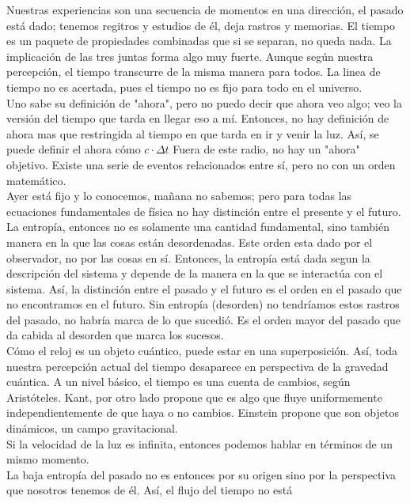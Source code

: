 \documentclass[12pt,a4paper]{report}
\begin{document}
\begin{enumerate}
{			Nuestras experiencias son una secuencia de momentos en una dirección,
			el pasado está dado; tenemos regitros y estudios de él, deja rastros y
			memorias.
			El tiempo es un paquete de propiedades combinadas que si se separan,
			no queda nada. La implicación de las tres juntas forma algo muy fuerte.
			Aunque según
			nuestra percepción, el tiempo transcurre de la misma manera para todos.
			La linea de tiempo no es acertada, pues el tiempo no es fijo
			para todo en el universo.\\
			Uno sabe su definición de "ahora", pero no puedo decir que ahora veo algo;
			veo la versión del tiempo que tarda en llegar eso a mí. Entonces, no hay
			definición de ahora mas que restringida al tiempo en que tarda en ir y
			venir la luz. Así, se puede definir el ahora cómo $c\cdot\Delta t$
			Fuera de este radio, no hay un "ahora" objetivo. Existe
			una serie de eventos relacionados entre sí, pero no con un orden
			matemático.\\
			Ayer está fijo y lo conocemos, mañana no sabemos; pero para todas las
			ecuaciones fundamentales de física no hay distinción entre el presente y el
			futuro. La entropía, entonces no es solamente una cantidad fundamental,
			sino también manera en la que las cosas están desordenadas. Este orden
			esta dado por el observador, no por las cosas en sí. Entonces, la entropía está
			dada segun la descripción del sistema y depende de la manera en la que se
			interactúa con el sistema. Así, la distinción entre el pasado y el futuro
			es el orden en el pasado que no encontramos en el futuro.
			Sin entropía (desorden) no tendríamos estos rastros del
			pasado, no habría marca de lo que sucedió. Es el orden mayor del pasado
			que da cabida al desorden que marca los sucesos.\\
			Cómo el reloj es un objeto cuántico, puede estar en una superposición. Así,
			toda nuestra percepción actual del tiempo desaparece en perspectiva de la
			gravedad cuántica. A un nivel básico, el tiempo es una cuenta de cambios,
			según Aristóteles. Kant, por otro lado propone que es algo que fluye
			uniformemente independientemente de que haya o no cambios. Einstein propone
			que son objetos dinámicos, un campo gravitacional.\\
			Si la
			velocidad de la luz es infinita, entonces podemos hablar en términos de
			un mismo momento.\\
			La baja entropía del pasado no es entonces por su origen sino por la
			perspectiva que nosotros tenemos de él. Así, el flujo del tiempo no está
}
\end{enumerate}
\end{document}

